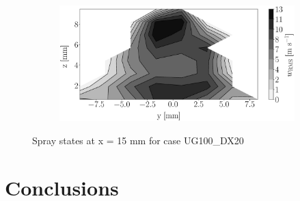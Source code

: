 \begin{figure}[h!]
\begin{subfigure}[b]{0.22\textwidth}
\end{subfigure}
   \hspace{0.17in}
\begin{subfigure}[b]{0.22\textwidth}
	\centering
   \includegraphics[scale=0.17]{./part2_developments/figures_ch5_resolved_JICF/injectors_SLI/uG100_dx20_x15_uz_rms_map.eps}
\end{subfigure}
\caption{Spray states at x = 15 mm for case UG100\_DX20}
\label{fig:injectors_sli_uG100_dx20_x15}
\end{figure}


\clearpage

\section{Conclusions}

